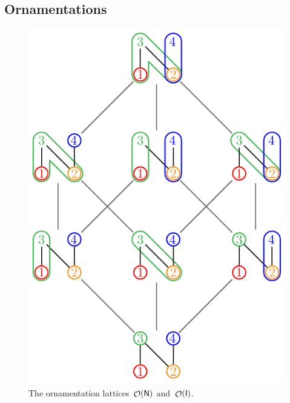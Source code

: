 \documentclass{amsart}
\theoremstyle{definition}
\renewcommand{\c}[1]{\mathcal{#1}} %
\DeclareMathOperator{\Orn}{\c{O}}  %
\newcommand{\Igraph}{\sf I} %
\newcommand{\Ngraph}{\sf N} %
\begin{document}

\subsection{Ornamentations}
\label{subsec:ornamentations}

\begin{figure}[b]
	\centerline{\includegraphics[scale=.68]{ornamentationsN} \qquad {}}
	\caption{The ornamentation lattices~$\Orn(\Ngraph)$ and~$\Orn(\Igraph)$.}
	\label{fig:ornamentationsNI}
\end{figure}
\end{document}
